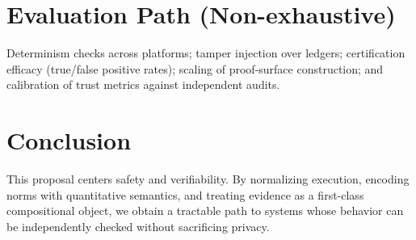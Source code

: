 \documentclass[11pt,a4paper]{article}
\numberwithin{equation}{section}
\theoremstyle{plain}
\theoremstyle{definition}
\theoremstyle{remark}
\begin{document}
\section{Evaluation Path (Non-exhaustive)}
Determinism checks across platforms; tamper injection over ledgers; certification efficacy (true/false positive rates); scaling of proof-surface construction; and calibration of trust metrics against independent audits.

\section{Conclusion}
This proposal centers safety and verifiability. By normalizing execution, encoding norms with quantitative semantics, and treating evidence as a first-class compositional object, we obtain a tractable path to systems whose behavior can be independently checked without sacrificing privacy.

% 
% 
\end{document}
